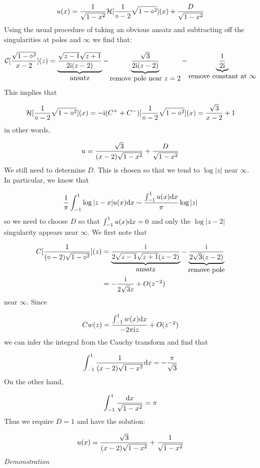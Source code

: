 \documentclass[12pt,a4paper]{article}
\def\D{ {\rm d} }
\def\I{ {\rm i} }
\def\CC{ {\cal C} }
\def\HH{ {\cal H} }
\def\dx{\D x}
\begin{document}
\[
u(x) = {1\over\sqrt{1-x^2}} \HH [{1 \over \diamond-2} \sqrt{1-\diamond^2}](x) + {D \over \sqrt{1-x^2}}
\]
Using the usual procedure of taking an obvious ansatz and subtracting off the singularities at poles and $\infty$ we find that:

\[
\CC[{\sqrt{1-\diamond^2} \over x -2}](z) = 
\underbrace{\sqrt{z-1} \sqrt{z+1} \over 2 \I (z-2)}_{\hbox{ansatz}} - \underbrace{\sqrt 3\over 2 \I (z-2)}_{\hbox{remove pole near $z=2$}} - \underbrace{{1 \over 2 \I}}_{\hbox{remove constant at $\infty$}}
\]
This implies that

\[
\HH[{1 \over\diamond-2} \sqrt{1-\diamond^2}](x) = -\I(C^+ + C^-)[{1 \over\diamond-2} \sqrt{1-\diamond^2}](x) = {\sqrt 3 \over x -2} + 1
\]
in other words, 

\[
u = {\sqrt{3} \over (x - 2) \sqrt{1-x^2}} + {D \over \sqrt{1-x^2}}
\]
We still need to determine $D$. This is chosen so that we tend to $\log |z|$ near $\infty$. In particular, we know that

\[
{1 \over \pi} \int_{-1}^1 \log|z-x| u(x) \dx \sim  {\int_{-1}^1 u(x) \dx \over \pi}  \log |z|
\]
so we need to choose $D$ so that $\int_{-1}^1 u(x) \dx = 0$ and only the $\log|z-2|$ singularity appears near $\infty$. We first note that 


\begin{align*}
C[{1 \over (\diamond - 2) \sqrt{1-\diamond^2}}](z) &= \underbrace{{\I \over 2 \sqrt{z-1} \sqrt{z+1} (z-2)}}_{\hbox{ansatz}} - \underbrace{{\I \over  2\sqrt{3} (z-2)}}_{\hbox{remove pole}} \\
& = -{\I \over 2 \sqrt{3} z} + O(z^{-2})
\end{align*}
near $\infty$. Since 

\[
Cw(z)  ={ \int_{-1}^1 w(x) \dx \over -2\pi \I z} + O(z^{-2})  
\]
we can  infer the integral from the Cauchy transform and find that

\[
\int_{-1}^1 {1 \over (x - 2) \sqrt{1-x^2}} \dx = -{ \pi \over \sqrt{3}}
\]
On the other hand,

\[
\int_{-1}^1 {\dx \over \sqrt{1-x^2}} = \pi
\]
Thus we require $D = 1$ and have the solution:

\[
u(x) = {\sqrt{3} \over (x - 2) \sqrt{1-x^2}} + {1 \over \sqrt{1-x^2}}
\]
\emph{Demonstration} 
\end{document}

